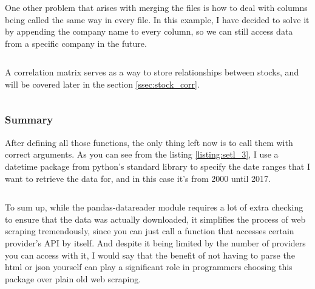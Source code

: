 \documentclass[12pt, a4paper]{article}
\begin{document}
\bgroup
  \inputminted[linenos, breaklines=true, fontsize=\scriptsize, firstnumber=last]{python}{src/stocks/etl/2c_reindex.py}
  \label{listing:setl_2c_reindex}
\egroup

One other problem that arises with merging the files is how to deal with columns being called the same way in every file. In this example, I have decided to solve it by appending the company name to every column, so we can still access data from a specific company in the future.

\bgroup
  \inputminted[linenos, breaklines=true, fontsize=\scriptsize, firstnumber=last]{python}{src/stocks/etl/2d_merge.py}
  \label{listing:setl_2d_merge}
\egroup

A correlation matrix serves as a way to store relationships between stocks, and will be covered later in the section \ref{ssec:stock_corr}.

\bgroup
  \inputminted[linenos, breaklines=true, fontsize=\scriptsize, firstnumber=last]{python}{src/stocks/etl/2f_corr.py}
  \label{listing:setl_2f_corr}
\egroup


\subsubsection{Summary}

After defining all those functions, the only thing left now is to call them with correct arguments. As you can see from the listing \ref{listing:setl_3}, I use a datetime package from python’s standard library to specify the date ranges that I want to retrieve the data for, and in this case it’s from 2000 until 2017.

\bgroup
  \inputminted[linenos, breaklines=true, fontsize=\scriptsize, firstnumber=last]{python}{src/stocks/etl/3_executing.py}
  \label{listing:setl_3}
\egroup

To sum up, while the pandas-datareader module requires a lot of extra checking to ensure that the data was actually downloaded, it simplifies the process of web scraping tremendously, since you can just call a function that accesses certain provider’s API by itself. And despite it being limited by the number of providers you can access with it, I would say that the benefit of not having to parse the html or json yourself can play a significant role in programmers choosing this package over plain old web scraping.
\end{document}

